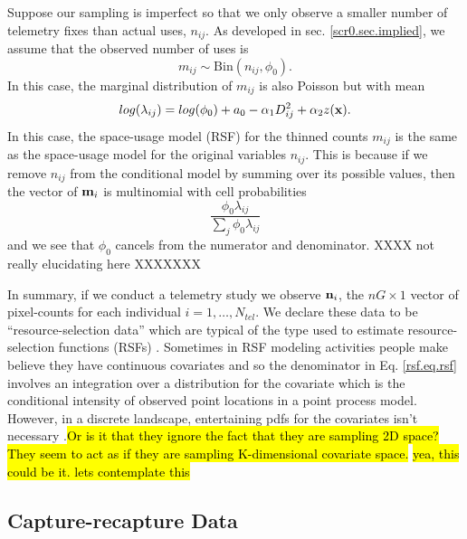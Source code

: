 Suppose our sampling is imperfect so that we only observe a smaller
number of telemetry fixes than actual uses, $n_{ij}$. As developed in
sec. \ref{scr0.sec.implied}, we assume that the observed number of
uses is
\[
 m_{ij} \sim \mbox{Bin}(n_{ij}, \phi_{0}).
\]
In this case, the marginal distribution of $m_{ij}$ is also Poisson
but with mean
\[
 log(\lambda_{ij}) = log(\phi_{0}) + a_{0} -\alpha_{1} D_{ij}^{2} +  \alpha_{2} z({\bf x}).
\]
In this case, the space-usage model (RSF) for the
thinned counts $m_{ij}$ is the same as the space-usage model for the
original variables $n_{ij}$.  This is because if we remove $n_{ij}$
from the conditional
 model by summing over its possible values, then the vector of
${\bf m}_{i}$ is multinomial with cell probabilities
\[
\frac{\phi_{0}\lambda_{ij}}{\sum_{j} \phi_{0} \lambda_{ij}}
\]
and we see that $\phi_{0}$ cancels from the numerator and
denominator. XXXX not really elucidating here XXXXXXX


In summary, if we conduct a telemetry study we observe ${\bf n}_{i}$,
the $nG \times 1$ vector of pixel-counts for each individual
$i=1,\ldots,N_{tel}$.  We declare these data to be
``resource-selection data'' which are typical of the type used to
estimate resource-selection functions (RSFs) \citep{manly_etal:2002}.
Sometimes in RSF modeling activities people make believe they have
continuous covariates and so the denominator in Eq. \ref{rsf.eq.rsf}
involves an integration over a distribution for the covariate which is
the conditional intensity of observed point locations in a point
process model. However, in a discrete landscape, entertaining pdfs for
the covariates isn't necessary \citep{royle_etal:2012mee}.\hl{Or is it
  that they ignore the fact that they are sampling 2D space? They seem
  to act as if they are sampling K-dimensional covariate space.}
\hl{yea, this could be it. lets contemplate this}

\subsection{Capture-recapture Data}

